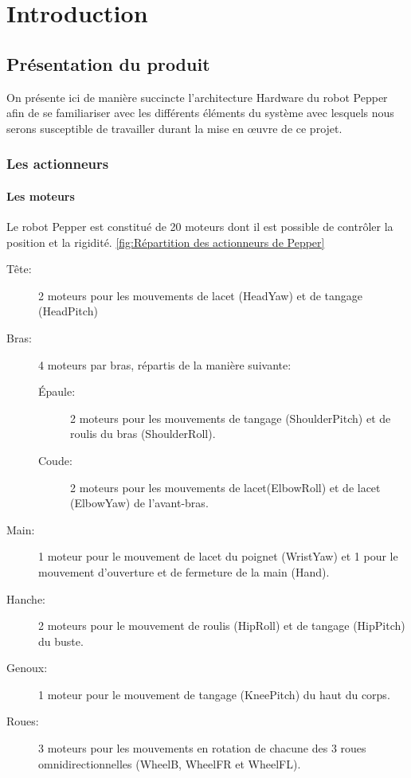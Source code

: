 \chapter{Introduction}
\label{Introduction}
\thispagestyle{fancy}

\section{Présentation du produit}
\label{Introduction:Présentation du produit}
On présente ici de manière succincte l'architecture Hardware du robot Pepper afin de se familiariser avec les différents éléments du système avec lesquels nous serons susceptible de travailler durant la mise en œuvre de ce projet.  

\subsection{Les actionneurs}
\label{Introduction:Présentation du produit:Les actionneurs}
\subsubsection{Les moteurs}
\label{Introduction:Présentation du produit:Les actionneurs: Les moteurs}
Le robot Pepper est constitué de 20 moteurs dont il est possible de contrôler la position et la rigidité. \ref{fig:Répartition des actionneurs de Pepper}
\begin{description}
	\item [Tête:] 2 moteurs pour les mouvements de lacet (HeadYaw) et de tangage (HeadPitch)
	\item [Bras:] 4 moteurs par bras, répartis de la manière suivante: 
	\begin{description}
		\item [Épaule:] 2 moteurs pour les mouvements de tangage (ShoulderPitch) et de roulis du bras (ShoulderRoll).
		\item [Coude:] 2 moteurs pour les mouvements de lacet(ElbowRoll) et de lacet (ElbowYaw) de l'avant-bras.
	\end{description}
	\item [Main:] 1 moteur pour le mouvement de lacet du poignet (WristYaw) et 1 pour le mouvement d'ouverture et de fermeture de la main (Hand).
	\item [Hanche:] 2 moteurs pour le mouvement de roulis (HipRoll) et de tangage (HipPitch) du buste.
	\item [Genoux:] 1 moteur pour le mouvement de tangage (KneePitch) du haut du corps.
	\item [Roues:] 3 moteurs pour les mouvements en rotation de chacune des 3 roues omnidirectionnelles (WheelB, WheelFR et WheelFL).
\end{description}


